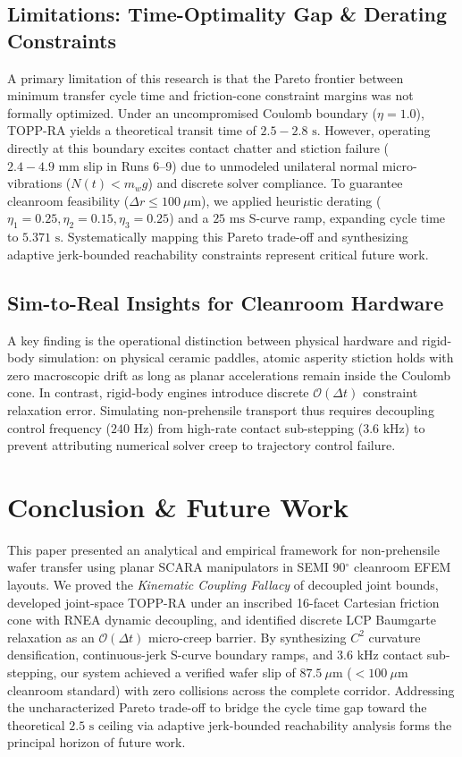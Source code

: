 \documentclass{article}
\begin{document}
\subsection{Limitations: Time-Optimality Gap \& Derating Constraints}
A primary limitation of this research is that the Pareto frontier between minimum transfer cycle time and friction-cone constraint margins was not formally optimized. Under an uncompromised Coulomb boundary ($\eta = 1.0$), TOPP-RA yields a theoretical transit time of $2.5 - 2.8\text{ s}$. However, operating directly at this boundary excites contact chatter and stiction failure ($2.4 - 4.9\text{ mm}$ slip in Runs 6--9) due to unmodeled unilateral normal micro-vibrations ($N(t) < m_w g$) and discrete solver compliance. To guarantee cleanroom feasibility ($\Delta r \le 100\ \mu\text{m}$), we applied heuristic derating ($\eta_1=0.25, \eta_2=0.15, \eta_3=0.25$) and a $25\text{ ms}$ S-curve ramp, expanding cycle time to $5.371\text{ s}$. Systematically mapping this Pareto trade-off and synthesizing adaptive jerk-bounded reachability constraints represent critical future work.

\subsection{Sim-to-Real Insights for Cleanroom Hardware}
A key finding is the operational distinction between physical hardware and rigid-body simulation: on physical ceramic paddles, atomic asperity stiction holds with zero macroscopic drift as long as planar accelerations remain inside the Coulomb cone. In contrast, rigid-body engines introduce discrete $\mathcal{O}(\Delta t)$ constraint relaxation error. Simulating non-prehensile transport thus requires decoupling control frequency ($240\text{ Hz}$) from high-rate contact sub-stepping ($3.6\text{ kHz}$) to prevent attributing numerical solver creep to trajectory control failure.

\section{Conclusion \& Future Work}
This paper presented an analytical and empirical framework for non-prehensile wafer transfer using planar SCARA manipulators in SEMI 90$^\circ$ cleanroom EFEM layouts. We proved the \textit{Kinematic Coupling Fallacy} of decoupled joint bounds, developed joint-space TOPP-RA under an inscribed 16-facet Cartesian friction cone with RNEA dynamic decoupling, and identified discrete LCP Baumgarte relaxation as an $\mathcal{O}(\Delta t)$ micro-creep barrier. By synthesizing $C^2$ curvature densification, continuous-jerk S-curve boundary ramps, and $3.6\text{ kHz}$ contact sub-stepping, our system achieved a verified wafer slip of $87.5\ \mu\text{m}$ ($< 100\ \mu\text{m}$ cleanroom standard) with zero collisions across the complete corridor. Addressing the uncharacterized Pareto trade-off to bridge the cycle time gap toward the theoretical $2.5\text{ s}$ ceiling via adaptive jerk-bounded reachability analysis forms the principal horizon of future work.
\end{document}
